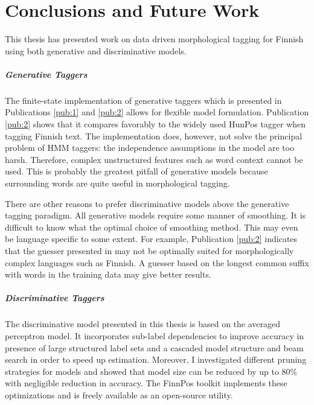 \chapter{Conclusions and Future Work}
\label{chapter:conclusions}

This thesis has presented work on data driven morphological tagging
for Finnish using both generative and discriminative models.

\paragraph{Generative Taggers} The finite-state implementation of
generative taggers which is presented in Publications \ref{pub:1} and
\ref{pub:2} allows for flexible model formulation. Publication
\ref{pub:2} shows that it compares favorably to the widely used HunPos
tagger when tagging Finnish text. The implementation does, however,
not solve the principal problem of HMM taggers: the independence
assumptions in the model are too harsh. Therefore, complex
unstructured features such as word context cannot be used. This is
probably the greatest pitfall of generative models because surrounding
words are quite useful in morphological tagging.

There are other reasons to prefer discriminative models above the
generative tagging paradigm. All generative models require some manner
of smoothing. It is difficult to know what the optimal choice of
smoothing method. This may even be language specific to some
extent. For example, Publication \ref{pub:2} indicates that the
guesser presented in \cite{Brants2000} may not be optimally suited for
morphologically complex languages such as Finnish. A guesser based on the
longest common suffix with words in the training data may give better
results.

\paragraph{Discriminative Taggers} The discriminative model presented
in this thesis is based on the averaged perceptron model. It
incorporates sub-label dependencies to improve accuracy in presence of
large structured label sets and a cascaded model structure and beam
search in order to speed up estimation. Moreover, I investigated
different pruning strategies for models and showed that model size can
be reduced by up to 80\% with negligible reduction in accuracy. The
FinnPos toolkit implements these optimizations and is freely available
as an open-source utility.

